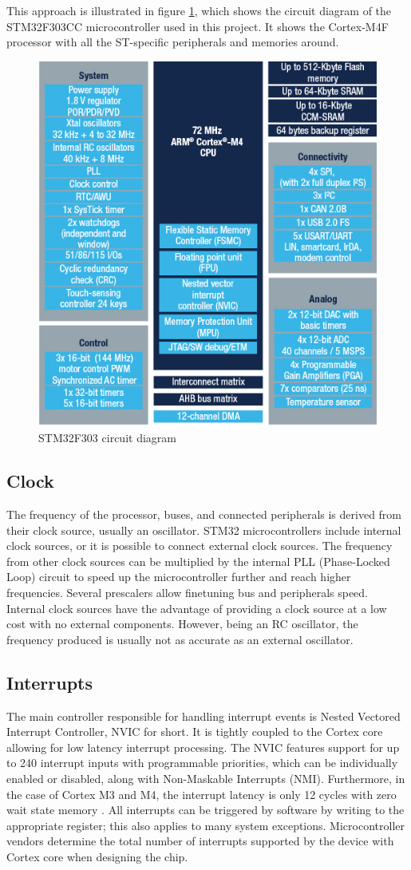 This approach is illustrated in figure \ref{fig:f303}, which shows the circuit diagram of the STM32F303CC microcontroller used in this project. It shows the Cortex-M4F processor with all the ST-specific peripherals and memories around.
\begin{figure}
\centering
\includegraphics[width=0.6\linewidth]{support/pic/en.bd_stm32f303.jpg}
\caption{STM32F303 circuit diagram \cite{f303_diagram}}
\label{fig:f303}
\end{figure}

	\subsection{Clock}
	\label{sub:clock}
The frequency of the processor, buses, and connected peripherals is derived from their clock source, usually an oscillator. STM32 microcontrollers include internal clock sources, or it is possible to connect external clock sources. The frequency from other clock sources can be multiplied by the internal PLL (Phase-Locked Loop) circuit to speed up the microcontroller further and reach higher frequencies. Several prescalers allow finetuning bus and peripherals speed. Internal clock sources have the advantage of providing a clock source at a low cost with no external components. However, being an RC oscillator, the frequency produced is usually not as accurate as an external oscillator.

	\subsection{Interrupts}
	\label{sub:nvic}
The main controller responsible for handling interrupt events is Nested Vectored Interrupt Controller, NVIC for short. It is tightly coupled to the Cortex core allowing for low latency interrupt processing. The NVIC features support for up to 240 interrupt inputs with programmable priorities, which can be individually enabled or disabled, along with Non-Maskable Interrupts (NMI). Furthermore, in the case of Cortex M3 and M4, the interrupt latency is only 12 cycles with zero wait state memory \cite{yu}. All interrupts can be triggered by software by writing to the appropriate register; this also applies to many system exceptions. Microcontroller vendors determine the total number of interrupts supported by the device with Cortex core when designing the chip.

